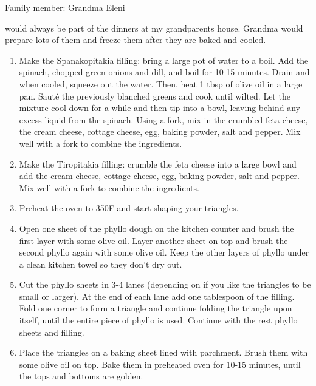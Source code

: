 Family member: Grandma Eleni

 would always be part of the dinners at my grandparents house. Grandma would prepare lots of them and freeze them after they are baked and cooled.

\begin{enumerate}
    \item Make the Spanakopitakia filling: bring a large pot of water to a boil. Add the spinach, chopped green onions and dill, and boil for 10-15 minutes. Drain and when cooled, squeeze out the water. Then, heat 1 tbsp of olive oil in a large pan. Sauté the previously blanched greens and cook until wilted. Let the mixture cool down for a while and then tip into a bowl, leaving behind any excess liquid from the spinach. Using a fork, mix in the crumbled feta cheese, the cream cheese, cottage cheese, egg, baking powder, salt and pepper. Mix well with a fork to combine the ingredients.
    \item Make the Tiropitakia filling: crumble the feta cheese into a large bowl and add the cream cheese, cottage cheese, egg, baking powder, salt and pepper. Mix well with a fork to combine the ingredients.
    \item Preheat the oven to 350\degree F and start shaping your triangles.
    \item Open one sheet of the phyllo dough on the kitchen counter and brush the first layer with some olive oil. Layer another sheet on top and brush the second phyllo again with some olive oil. Keep the other layers of phyllo under a clean kitchen towel so they don't dry out.
    \item Cut the phyllo sheets in 3-4 lanes (depending on if you like the triangles to be small or larger). At the end of each lane add one tablespoon of the filling. Fold one corner to form a triangle and continue folding the triangle upon itself, until the entire piece of phyllo is used. Continue with the rest phyllo sheets and filling.
    \item Place the triangles on a baking sheet lined with parchment. Brush them with some olive oil on top. Bake them in preheated oven for 10-15 minutes, until the tops and bottoms are golden.
\end{enumerate}
